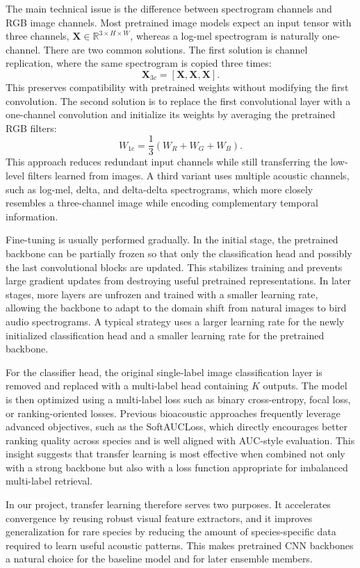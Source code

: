\documentclass[a4paper,12pt]{article}
\begin{document}
The main technical issue is the difference between spectrogram channels and RGB image channels. Most pretrained image models expect an input tensor with three channels, $\mathbf{X}\in\mathbb{R}^{3\times H\times W}$, whereas a log-mel spectrogram is naturally one-channel. There are two common solutions. The first solution is channel replication, where the same spectrogram is copied three times:
\[
\mathbf{X}_{3c} = [\mathbf{X},\mathbf{X},\mathbf{X}].
\]
This preserves compatibility with pretrained weights without modifying the first convolution. The second solution is to replace the first convolutional layer with a one-channel convolution and initialize its weights by averaging the pretrained RGB filters:
\[
W_{1c}=\frac{1}{3}\left(W_R+W_G+W_B\right).
\]
This approach reduces redundant input channels while still transferring the low-level filters learned from images. A third variant uses multiple acoustic channels, such as log-mel, delta, and delta-delta spectrograms, which more closely resembles a three-channel image while encoding complementary temporal information.

Fine-tuning is usually performed gradually. In the initial stage, the pretrained backbone can be partially frozen so that only the classification head and possibly the last convolutional blocks are updated. This stabilizes training and prevents large gradient updates from destroying useful pretrained representations. In later stages, more layers are unfrozen and trained with a smaller learning rate, allowing the backbone to adapt to the domain shift from natural images to bird audio spectrograms. A typical strategy uses a larger learning rate for the newly initialized classification head and a smaller learning rate for the pretrained backbone.

For the classifier head, the original single-label image classification layer is removed and replaced with a multi-label head containing $K$ outputs. The model is then optimized using a multi-label loss such as binary cross-entropy, focal loss, or ranking-oriented losses. Previous bioacoustic approaches frequently leverage advanced objectives, such as the SoftAUCLoss, which directly encourages better ranking quality across species and is well aligned with AUC-style evaluation. This insight suggests that transfer learning is most effective when combined not only with a strong backbone but also with a loss function appropriate for imbalanced multi-label retrieval.

In our project, transfer learning therefore serves two purposes. It accelerates convergence by reusing robust visual feature extractors, and it improves generalization for rare species by reducing the amount of species-specific data required to learn useful acoustic patterns. This makes pretrained CNN backbones a natural choice for the baseline model and for later ensemble members.
\end{document}
